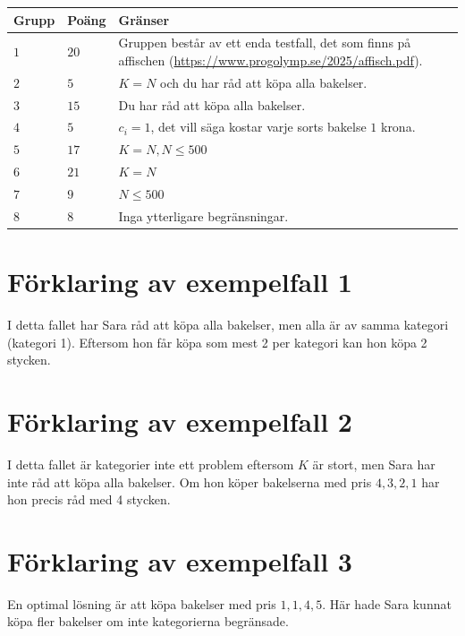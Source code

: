 \noindent
\begin{tabular}{| l | l | p{12cm} |}
  \hline
  \textbf{Grupp} & \textbf{Poäng} & \textbf{Gränser} \\ \hline
  $1$    & $20$       & Gruppen består av ett enda testfall, det som finns på affischen (\url{https://www.progolymp.se/2025/affisch.pdf}). \\ \hline 
  $2$    & $5$        & $K=N$ och du har råd att köpa alla bakelser. \\ \hline
  $3$    & $15$       & Du har råd att köpa alla bakelser. \\ \hline
  $4$    & $5$        & $c_i=1$, det vill säga kostar varje sorts bakelse $1$ krona. \\ \hline
  $5$    & $17$       & $K=N, N \leq 500$ \\ \hline
  $6$    & $21$       & $K=N$ \\ \hline
  $7$    & $9$        & $N \leq 500$ \\ \hline
  $8$    & $8$        & Inga ytterligare begränsningar. \\ \hline
\end{tabular}

\section*{Förklaring av exempelfall 1}
I detta fallet har Sara råd att köpa alla bakelser, men alla är av samma kategori (kategori 1). Eftersom hon får köpa
som mest 2 per kategori kan hon köpa 2 stycken.

\section*{Förklaring av exempelfall 2}
I detta fallet är kategorier inte ett problem eftersom $K$ är stort, men Sara har inte råd att köpa alla bakelser.
Om hon köper bakelserna med pris $4, 3, 2, 1$ har hon precis råd med 4 stycken.

\section*{Förklaring av exempelfall 3}
En optimal lösning är att köpa bakelser med pris $1,1,4,5$. Här hade Sara kunnat köpa fler bakelser om inte kategorierna
begränsade.
